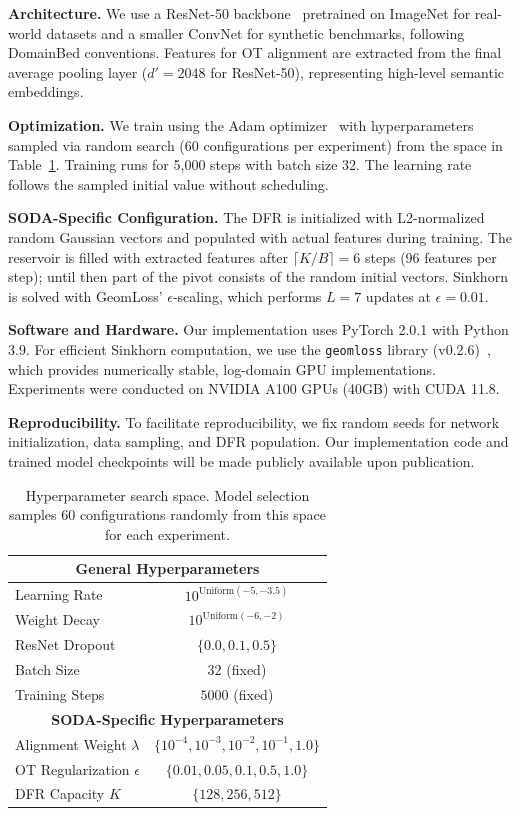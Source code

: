 \textbf{Architecture.} We use a ResNet-50 backbone~\citep{he2016deep} pretrained on ImageNet for real-world datasets and a smaller ConvNet for synthetic benchmarks, following DomainBed conventions. Features for OT alignment are extracted from the final average pooling layer ($d' = 2048$ for ResNet-50), representing high-level semantic embeddings.

\textbf{Optimization.} We train using the Adam optimizer~\citep{kingma2014adam} with hyperparameters sampled via random search (60 configurations per experiment) from the space in Table~\ref{tab:hparams}. Training runs for 5,000 steps with batch size 32. The learning rate follows the sampled initial value without scheduling.
\begin{sloppypar} 
\textbf{SODA-Specific Configuration.} The DFR is initialized with L2-normalized random Gaussian vectors and populated with actual features during training. The reservoir is filled with extracted features after $\lceil K/B\rceil=6$ steps (96 features per step); until then part of the pivot consists of the random initial vectors. Sinkhorn is solved with GeomLoss' $\epsilon$-scaling, which performs $L=7$ updates at $\epsilon=0.01$.
\end{sloppypar} 
\textbf{Software and Hardware.} Our implementation uses PyTorch 2.0.1 with Python 3.9. For efficient Sinkhorn computation, we use the \texttt{geomloss} library (v0.2.6)~\citep{feydy2019interpolating}, which provides numerically stable, log-domain GPU implementations. Experiments were conducted on NVIDIA A100 GPUs (40GB) with CUDA 11.8.

\textbf{Reproducibility.} To facilitate reproducibility, we fix random seeds for network initialization, data sampling, and DFR population. Our implementation code and trained model checkpoints will be made publicly available upon publication.

\begin{table}[t]
\caption{Hyperparameter search space. Model selection samples 60 configurations randomly from this space for each experiment.}
\label{tab:hparams}
\centering
\small
\renewcommand{\arraystretch}{1.1}
\begin{tabular}{lc}
\toprule
\multicolumn{2}{c}{\textbf{General Hyperparameters}} \\
\midrule
Learning Rate & $10^{\text{Uniform}(-5, -3.5)}$ \\
Weight Decay & $10^{\text{Uniform}(-6, -2)}$ \\
ResNet Dropout & $\{0.0, 0.1, 0.5\}$ \\
Batch Size & $32$ (fixed) \\
Training Steps & $5000$ (fixed) \\
\midrule
\multicolumn{2}{c}{\textbf{SODA-Specific Hyperparameters}} \\
\midrule
Alignment Weight $\lambda$ & $\{10^{-4}, 10^{-3}, 10^{-2}, 10^{-1}, 1.0\}$ \\
OT Regularization $\epsilon$ & $\{0.01, 0.05, 0.1, 0.5, 1.0\}$ \\
DFR Capacity $K$ & $\{128, 256, 512\}$ \\
\bottomrule
\end{tabular}
\end{table}


